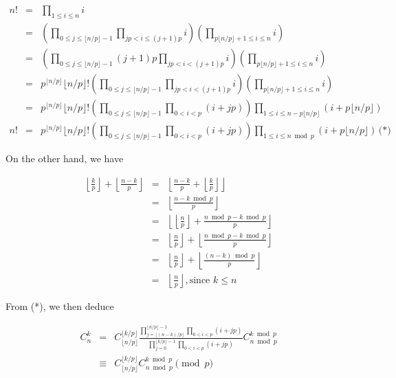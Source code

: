 \documentclass[a4paper,12pt]{article}
\begin{document}
\begin{eqnarray*}
  n! &=& \prod_{1\le i\le n} i \\
  &=& \left( \prod_{0 \le j \le \lfloor n/p\rfloor - 1} \prod_{jp < i
    \le (j+1)p} i \right) \left( \prod_{p\lfloor n/p\rfloor + 1 \le i
    \le n} i\right) \\
  &=& \left( \prod_{0 \le j\le \lfloor n/p\rfloor - 1} (j+1)p
  \prod_{jp < i <(j+1)p} i \right)\left( \prod_{p\lfloor n/p\rfloor +
    1 \le i \le n} i\right) \\
  &=& p^{\lfloor n/p\rfloor} \lfloor n/p\rfloor!
  \left( \prod_{ 0 \le j \le \lfloor n/p\rfloor - 1} \prod_{jp < i <
    (j+1)p} i\right)\left( \prod_{p\lfloor n/p\rfloor + 1 \le i \le n}
  i\right) \\
  &=& p^{\lfloor n/p\rfloor} \lfloor n/p\rfloor! \left( \prod_{0\le j
    \le \lfloor n/p\rfloor - 1} \prod_{0 < i < p}(i+jp)\right)
  \prod_{1\le i\le n - p \lfloor n/p\rfloor} (i+p\lfloor n/p\rfloor) \\
  n!  &=& p^{\lfloor n/p\rfloor} \lfloor n/p\rfloor! \left( \prod_{0\le j
    \le \lfloor n/p\rfloor - 1} \prod_{0 < i < p}(i+jp)\right)
  \prod_{1\le i\le n \bmod p} (i+p\lfloor n/p\rfloor)\, \mbox{(*)}
\end{eqnarray*}

On the other hand, we have

\begin{eqnarray*}
  \left\lfloor \frac{k}{p}\right\rfloor + \left\lfloor
  \frac{n-k}{p}\right\rfloor &=& \left\lfloor \frac{n-k}{p} + \left\lfloor
  \frac{k}{p}\right\rfloor\right\rfloor \\
  &=& \left\lfloor \frac{n - k \bmod p}{p}\right\rfloor \\
  &=& \left\lfloor \left\lfloor \frac{n}{p}\right\rfloor + \frac{n
    \bmod p - k\bmod p}{p}\right\rfloor \\
  &=& \left\lfloor \frac{n}{p}\right\rfloor + \left\lfloor  \frac{n
    \bmod p - k\bmod p}{p}\right\rfloor \\
  &=& \left\lfloor \frac{n}{p}\right\rfloor + \left\lfloor
  \frac{(n-k)\bmod p}{p}\right\rfloor \\
  &=& \left\lfloor \frac{n}{p}\right\rfloor, \mbox{since $k \le n$}
\end{eqnarray*}

From (*), we then deduce

\begin{eqnarray*}
  C_n^k &=& C_{\lfloor n/p\rfloor}^{\lfloor k/p\rfloor}
  \frac{\prod_{j=\lfloor (n-k)/p\rfloor}^{\lfloor
      n/p\rfloor-1}\prod_{0<i<p}(i+jp)} {\prod_{j=0}^{\lfloor
      k/p\rfloor-1}\prod_{0<i<p}(i+jp)} C_{n\bmod p}^{k\bmod p} \\
  &\equiv&  C_{\lfloor n/p\rfloor}^{\lfloor k/p\rfloor} C_{n\bmod
    p}^{k\bmod p} \pmod p
\end{eqnarray*}
\end{document}
